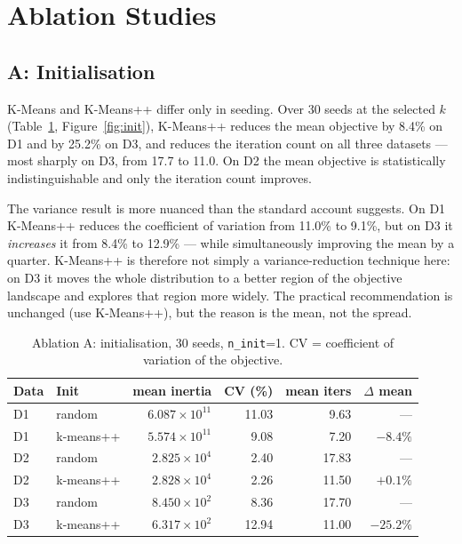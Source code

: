 \documentclass[11pt,a4paper]{article}
\begin{document}
\section{Ablation Studies}\label{sec:ablation}

\subsection{A: Initialisation}\label{sec:init}
K-Means and K-Means++ differ only in seeding. Over 30 seeds at the selected $k$
(Table~\ref{tab:init}, Figure~\ref{fig:init}), K-Means++ reduces the mean
objective by 8.4\% on D1 and by 25.2\% on D3, and reduces the iteration count on
all three datasets --- most sharply on D3, from 17.7 to 11.0. On D2 the mean
objective is statistically indistinguishable and only the iteration count
improves.

The variance result is more nuanced than the standard account suggests. On D1
K-Means++ reduces the coefficient of variation from 11.0\% to 9.1\%, but on D3
it \emph{increases} it from 8.4\% to 12.9\% --- while simultaneously improving
the mean by a quarter. K-Means++ is therefore not simply a variance-reduction
technique here: on D3 it moves the whole distribution to a better region of the
objective landscape and explores that region more widely. The practical
recommendation is unchanged (use K-Means++), but the reason is the mean, not the
spread.

\begin{table}[h]\centering\small
\caption{Ablation A: initialisation, 30 seeds, \texttt{n\_init}=1.
CV = coefficient of variation of the objective.}
\label{tab:init}
\begin{tabular}{llrrrr}
\toprule
\textbf{Data} & \textbf{Init} & \textbf{mean inertia} & \textbf{CV (\%)} &
\textbf{mean iters} & \textbf{$\Delta$ mean} \\
\midrule
D1 & random     & $6.087\times10^{11}$ & 11.03 & 9.63 & --- \\
D1 & k-means++  & $5.574\times10^{11}$ & 9.08  & 7.20 & $-8.4\%$ \\
D2 & random     & $2.825\times10^{4}$  & 2.40  & 17.83 & --- \\
D2 & k-means++  & $2.828\times10^{4}$  & 2.26  & 11.50 & $+0.1\%$ \\
D3 & random     & $8.450\times10^{2}$  & 8.36  & 17.70 & --- \\
D3 & k-means++  & $6.317\times10^{2}$  & 12.94 & 11.00 & $\mathbf{-25.2\%}$ \\
\bottomrule
\end{tabular}
\end{table}
\end{document}
